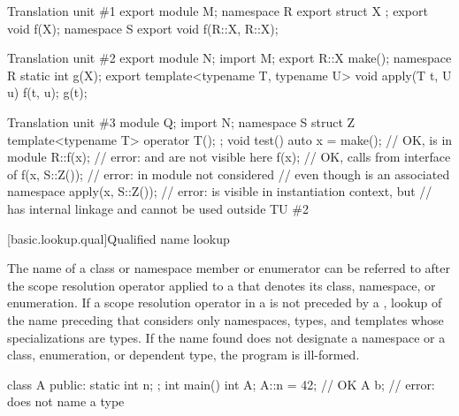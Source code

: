 \pnum
\begin{example}
\begin{codeblocktu}{Translation unit \#1}
export module M;
namespace R {
  export struct X {};
  export void f(X);
}
namespace S {
  export void f(R::X, R::X);
}
\end{codeblocktu}

\begin{codeblocktu}{Translation unit \#2}
export module N;
import M;
export R::X make();
namespace R { static int g(X); }
export template<typename T, typename U> void apply(T t, U u) {
  f(t, u);
  g(t);
}
\end{codeblocktu}

\begin{codeblocktu}{Translation unit \#3}
module Q;
import N;
namespace S {
  struct Z { template<typename T> operator T(); };
}
void test() {
  auto x = make();              // OK,  is  in module 
  R::f(x);                      // error:  and  are not visible here
  f(x);                         // OK, calls  from interface of 
  f(x, S::Z());                 // error:  in module  not considered
                                // even though  is an associated namespace
  apply(x, S::Z());             // error:  is visible in instantiation context, but
                                //  has internal linkage and cannot be used outside TU \#2
}
\end{codeblocktu}
\end{example}

[basic.lookup.qual]{Qualified name lookup}

\pnum
{}%
%
%
The name of a class or namespace member
or enumerator can be referred to after the
\tcode{::} scope resolution operator applied to a
 that denotes its class,
namespace, or enumeration.
If a
\tcode{::} scope resolution
operator
in a  is not preceded by a ,
lookup of the name preceding that \tcode{::} considers only namespaces, types, and
templates whose specializations are types. If the
name found does not designate a namespace or a class, enumeration, or dependent type,
the program is ill-formed.
\begin{example}
\begin{codeblock}
class A {
public:
  static int n;
};
int main() {
  int A;
  A::n = 42;        // OK
  A b;              // error:  does not name a type
}
\end{codeblock}
\end{example}

